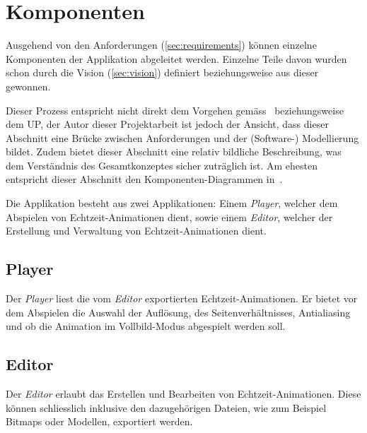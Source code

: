 
\section{Komponenten}
\label{sec:main-components}

Ausgehend von den Anforderungen (\ref{sec:requirements}) können einzelne
Komponenten der Applikation abgeleitet werden. Einzelne Teile davon wurden
schon durch die Vision (\ref{sec:vision}) definiert beziehungsweise aus dieser
gewonnen.

Dieser Prozess entspricht nicht direkt dem Vorgehen
gemäss~\cite{larman_applying_2004} beziehungsweise dem UP, der Autor dieser
Projektarbeit ist jedoch der Ansicht, dass dieser Abschnitt eine Brücke
zwischen Anforderungen und der (Software-) Modellierung bildet. Zudem bietet
dieser Abschnitt eine relativ bildliche Beschreibung, was dem Verständnis des
Gesamtkonzeptes sicher zuträglich ist. Am ehesten entspricht dieser Abschnitt
den Komponenten-Diagrammen in~\cite[S. 653 bis 654]{larman_applying_2004}.

Die Applikation besteht aus zwei Applikationen: Einem \textit{Player},
welcher dem Abspielen von Echtzeit-Animationen dient, sowie einem \textit{Editor},
welcher der Erstellung und Verwaltung von Echtzeit-Animationen dient.

\subsection{Player}
\label{subsec:main-components:player}

Der \textit{Player} liest die vom \textit{Editor} exportierten
Echtzeit-Animationen. Er bietet vor dem Abspielen die Auswahl der Auflösung,
des Seitenverhältnisses, Antialiasing und ob die Animation im Vollbild-Modus
abgespielt werden soll.

\subsection{Editor}
\label{subsec:main-components:editor}

Der \textit{Editor} erlaubt das Erstellen und Bearbeiten von
Echtzeit-Animationen. Diese können schliesslich inklusive den
dazugehörigen Dateien, wie zum Beispiel Bitmaps oder Modellen, exportiert
werden.

